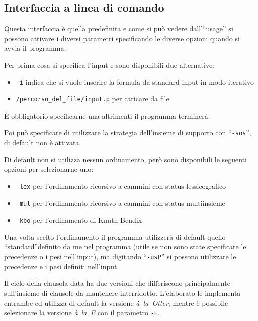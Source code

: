 \documentclass[a4paper,11pt]{article} %
\newcommand{\sintassi}{\texttt}
\begin{document}
\subsection{Interfaccia a linea di comando}\label{subsec: int. linea}
Questa interfaccia è quella predefinita e come si può vedere dall'``usage''
si possono attivare i diversi parametri specificando le diverse opzioni quando
si avvia il programma.

Per prima cosa si specifica l'input e sono disponibili due alternative:
\vspace{-1ex}
\begin{itemize}
  \item{\sintassi{-i}} indica che si vuole inserire la formula da standard input in modo iterativo
\vspace{-1ex}
  \item{\sintassi{/percorso\_del\_file/input.p}} per caricare da file
\end{itemize}
\vspace{-1ex}
\`E obbligatorio specificarne una altrimenti il programma terminerà.

Poi può specificare di utilizzare la strategia dell'insieme di supporto con 
``\sintassi{-sos}'', di default non è attivata.

Di default non si utilizza nessun ordinamento, però sono disponibili le seguenti 
opzioni per selezionarne uno:
\vspace{-1ex}
\begin{itemize}
  \item{\sintassi{-lex}} per l'ordinamento ricorsivo a cammini con status lessicografico
\vspace{-1ex}
  \item{\sintassi{-mul}} per l'ordinamento ricorsivo a cammini con status multiinsieme
\vspace{-1ex}
  \item{\sintassi{-kbo}} per l'ordinamento di Knuth-Bendix
\end{itemize}
\vspace{-1ex}
Una volta scelto l'ordinamento il programma utilizzerà di default quello 
``standard''definito da me nel programma
(utile se non sono state specificate le precedenze o i pesi nell'input),
ma digitando ``\sintassi{-usP}'' si possono utilizzare le precedenze e i pesi definiti 
nell'input.

Il ciclo della clausola data ha due versioni che differiscono principalmente
sull'insieme di clausole da mantenere interridotto. L'elaborato le implementa
entrambe ed utilizza di default la versione \emph{à~la~Otter}, mentre è possibile
selezionare la versione \emph{à~la~E} con il parametro \sintassi{-E}.
\end{document}

